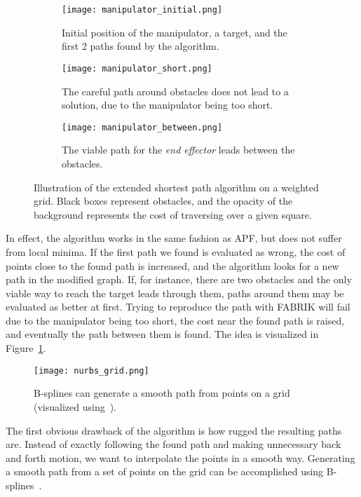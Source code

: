 \begin{figure}
    \centering
    \begin{subfigure}{.3\textwidth}
      \texttt{[image: manipulator\_initial.png]}
      \caption{Initial position of the manipulator, a target, and the first 2 paths found by the algorithm.}
    \end{subfigure}
    \begin{subfigure}{0.3\textwidth}
      \texttt{[image: manipulator\_short.png]}
      \caption{The careful path around obstacles does not lead to a solution, due to the manipulator being too short.}
    \end{subfigure}
    \begin{subfigure}{.3\textwidth}
      \texttt{[image: manipulator\_between.png]}
      \caption{The viable path for the \textit{end effector} leads between the obstacles.}
    \end{subfigure}
    \caption{Illustration of the extended shortest path algorithm on a weighted grid. Black boxes represent obstacles, and the opacity of the background represents the cost of traversing over a given square.}\label{fig:paths}
\end{figure}

In effect, the algorithm works in the same fashion as APF, but does not suffer from local minima. If the first path we found is evaluated as wrong, the cost of points close to the found path is increased, and the algorithm looks for a new path in the modified graph. If, for instance, there are two obstacles and the only viable way to reach the target leads through them, paths around them may be evaluated as better at first. Trying to reproduce the path with FABRIK will fail due to the manipulator being too short, the cost near the found path is raised, and eventually the path between them is found. The idea is visualized in Figure~\ref{fig:paths}.

\begin{wrapfigure}{r}{0.42\textwidth}
  \centering
  \texttt{[image: nurbs\_grid.png]}
  \caption{B-splines can generate a smooth path from points on a grid (visualized using~\cite{nurbs_vis}).}
\end{wrapfigure}

The first obvious drawback of the algorithm is how rugged the resulting paths are. Instead of exactly following the found path and making unnecessary back and forth motion, we want to interpolate the points in a smooth way. Generating a smooth path from a set of points on the grid can be accomplished using B-splines~\cite{nurbs}.

